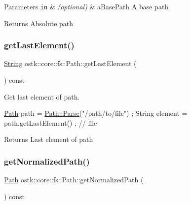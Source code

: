 \begin{DoxyParams}[1]{Parameters}
\mbox{\tt in}  & {\em (optional)} & a\+Base\+Path A base path \\
\hline
\end{DoxyParams}
\begin{DoxyReturn}{Returns}
Absolute path 
\end{DoxyReturn}
\mbox{\label{classostk_1_1core_1_1fs_1_1_path_a867fa80085bd7dd23b9856096ab6c115}} 
\subsubsection{\texorpdfstring{get\+Last\+Element()}{getLastElement()}}
{\footnotesize\ttfamily \hyperlink{classostk_1_1core_1_1types_1_1_string}{String} ostk\+::core\+::fs\+::\+Path\+::get\+Last\+Element (\begin{DoxyParamCaption}{ }\end{DoxyParamCaption}) const}



Get last element of path. 


\begin{DoxyCode}
\hyperlink{classostk_1_1core_1_1fs_1_1_path_a1a5fff28594542489223b4cfad6cc9fb}{Path} path = \hyperlink{classostk_1_1core_1_1fs_1_1_path_ad08539ba654f5df11c4bcb07276345ad}{Path::Parse}(\textcolor{stringliteral}{"/path/to/file"}) ;
String element = path.getLastElement() ; \textcolor{comment}{// file}
\end{DoxyCode}


\begin{DoxyReturn}{Returns}
Last element of path 
\end{DoxyReturn}
\mbox{\label{classostk_1_1core_1_1fs_1_1_path_a1bb35ee0009ce8174bfedb940232fe98}} 
\subsubsection{\texorpdfstring{get\+Normalized\+Path()}{getNormalizedPath()}}
{\footnotesize\ttfamily \hyperlink{classostk_1_1core_1_1fs_1_1_path}{Path} ostk\+::core\+::fs\+::\+Path\+::get\+Normalized\+Path (\begin{DoxyParamCaption}{ }\end{DoxyParamCaption}) const}



